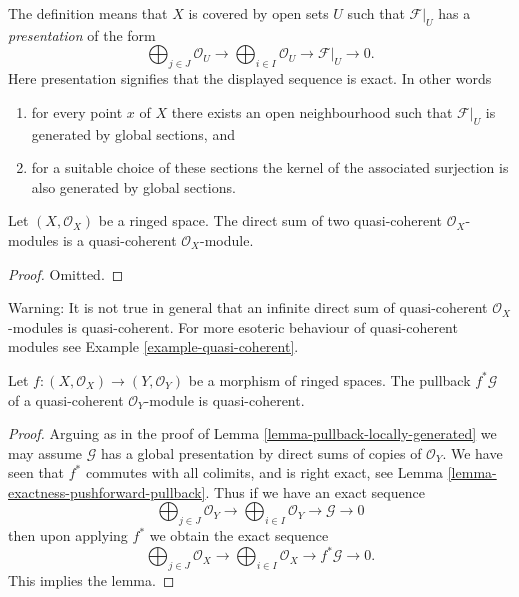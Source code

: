 \noindent
The definition means that $X$ is covered by open sets $U$
such that $\mathcal{F}|_U$ has a {\it presentation}
of the form
$$
\bigoplus\nolimits_{j \in J}
\mathcal{O}_U
\longrightarrow
\bigoplus\nolimits_{i \in I}
\mathcal{O}_U
\longrightarrow
\mathcal{F}|_U
\longrightarrow
0.
$$
Here presentation signifies that the displayed
sequence is exact. In other words
\begin{enumerate}
\item for every point $x$ of $X$ there exists
an open neighbourhood such that $\mathcal{F}|_U$
is generated by global sections, and
\item for a suitable choice of these sections
the kernel of the associated surjection is also
generated by global sections.
\end{enumerate}

\begin{lemma}
\label{lemma-direct-sum-quasi-coherent}
Let $(X, \mathcal{O}_X)$ be a ringed space.
The direct sum of two quasi-coherent $\mathcal{O}_X$-modules is
a quasi-coherent $\mathcal{O}_X$-module.
\end{lemma}

\begin{proof}
Omitted.
\end{proof}

\begin{remark}
\label{remark-infinite-direct-sum-quasi-coherent-not}
Warning: It is not true in general that an infinite
direct sum of quasi-coherent $\mathcal{O}_X$-modules
is quasi-coherent. For more esoteric behaviour of quasi-coherent
modules see Example \ref{example-quasi-coherent}.
\end{remark}

\begin{lemma}
\label{lemma-pullback-quasi-coherent}
Let $f : (X, \mathcal{O}_X) \to (Y, \mathcal{O}_Y)$
be a morphism of ringed spaces.
The pullback $f^*\mathcal{G}$ of a quasi-coherent
$\mathcal{O}_Y$-module is quasi-coherent.
\end{lemma}

\begin{proof}
Arguing as in the proof of Lemma \ref{lemma-pullback-locally-generated}
we may assume $\mathcal{G}$ has a global presentation by
direct sums of copies of $\mathcal{O}_Y$.
We have seen that $f^*$ commutes with all colimits,
and is right exact, see Lemma \ref{lemma-exactness-pushforward-pullback}.
Thus if we have an exact sequence
$$
\bigoplus\nolimits_{j \in J}
\mathcal{O}_Y
\longrightarrow
\bigoplus\nolimits_{i \in I}
\mathcal{O}_Y
\longrightarrow
\mathcal{G}
\longrightarrow
0
$$
then upon applying $f^*$ we obtain the exact sequence
$$
\bigoplus\nolimits_{j \in J}
\mathcal{O}_X
\longrightarrow
\bigoplus\nolimits_{i \in I}
\mathcal{O}_X
\longrightarrow
f^*\mathcal{G}
\longrightarrow
0.
$$
This implies the lemma.
\end{proof}

